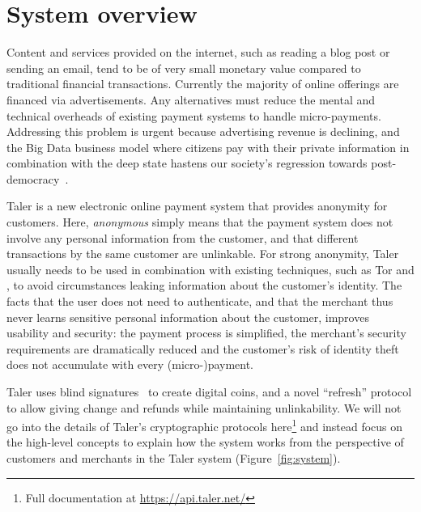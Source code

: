 \documentclass[twoside,letterpaper]{sigalternate}
\begin{document}
\maketitle

\section{System overview}

Content and services provided on the internet, such as reading a blog post or
sending an email, tend to be of very small monetary value compared to
traditional financial transactions.  Currently the majority of online offerings
are financed via advertisements.  Any alternatives must reduce the mental
and technical overheads of existing payment systems to handle micro-payments.
Addressing this problem is urgent because advertising revenue is declining,
and the Big Data business model where citizens pay with their
private information in combination with the deep state hastens our society's
regression towards post-democracy~\cite{rms2013democracy}.

Taler is a new electronic online payment system that provides
anonymity for customers.  Here, {\em anonymous} simply means that the
payment system does not involve any personal information from the
customer, and that different transactions by the same customer are
unlinkable.  For strong anonymity, Taler usually needs to be used in
combination with existing techniques, such as Tor and \cite{apod}, to
avoid circumstances leaking information about the customer's identity.  
The facts that the user does not need to authenticate, and that the merchant
thus never learns sensitive personal information about the customer,
improves usability and security: the payment process is simplified, the
merchant's security requirements are dramatically reduced and the customer's
risk of identity theft does not accumulate with every (micro-)payment.

Taler uses blind signatures~\cite{chaum1983blind} to create digital
coins, and a novel ``refresh'' protocol to allow giving change and
refunds while maintaining unlinkability.  We will not go into the
details of Taler's cryptographic protocols here\footnote{Full
documentation at \url{https://api.taler.net/}} and instead focus on the
high-level concepts to explain how the system works from the
perspective of customers and merchants in the Taler
system (Figure~\ref{fig:system}).
\end{document}
